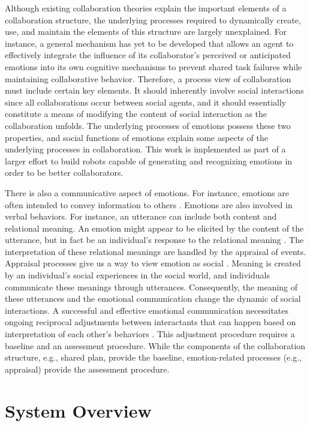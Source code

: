 \documentclass[12pt]{report}
\begin{document}
Although existing collaboration theories explain the important elements of a
collaboration structure, the underlying processes required to dynamically
create, use, and maintain the elements of this structure are largely
unexplained. For instance, a general mechanism has yet to be developed that
allows an agent to effectively integrate the influence of its collaborator's
perceived or anticipated emotions into its own cognitive mechanisms to prevent
shared task failures while maintaining collaborative behavior. Therefore, a
process view of collaboration must include certain key elements. It should
inherently involve social interactions since all collaborations occur between
social agents, and it should essentially constitute a means of modifying the
content of social interaction as the collaboration unfolds. The underlying
processes of emotions possess these two properties, and social functions of
emotions explain some aspects of the underlying processes in collaboration.
This work is implemented as part of a larger effort to build robots capable of
generating and recognizing emotions in order to be better collaborators.

There is also a communicative aspect of emotions. For instance, emotions are
often intended to convey information to others \cite{goffman:self-presentation}.
Emotions are also involved in verbal behaviors. For instance, an utterance can
include both content and relational meaning. An emotion might appear to be
elicited by the content of the utterance, but in fact be an individual's
response to the relational meaning \cite{planalp:communicating-emotion}. The
interpretation of these relational meanings are handled by the appraisal of
events. Appraisal processes give us a way to view emotion as social
\cite{hooft:sharing-emotions}. Meaning is created by an individual's social
experiences in the social world, and individuals communicate these meanings
through utterances. Consequently, the meaning of these utterances and the
emotional communication change the dynamic of social interactions. A successful
and effective emotional communication necessitates ongoing reciprocal
adjustments between interactants that can happen based on interpretation of each
other's behaviors \cite{parkinson:emotion-social-interaction}. This adjustment
procedure requires a baseline and an assessment procedure. While the components
of the collaboration structure, e.g., shared plan, provide the baseline,
emotion-related processes (e.g., appraisal) provide the assessment procedure.

\section{System Overview}
\end{document}
